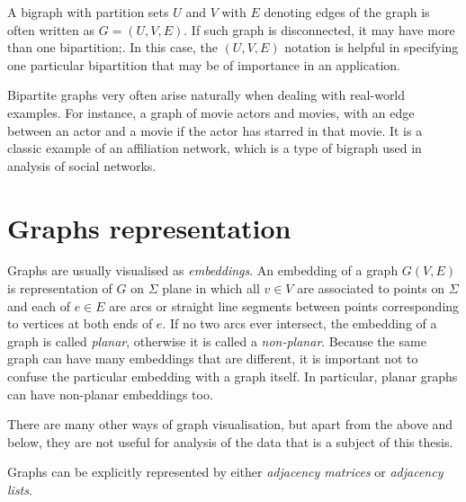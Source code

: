           A bigraph with partition sets $U$ and $V$ with $E$ denoting edges of the graph is often written as $G=(U,V,E)$. If such graph is disconnected, it may have more than one bipartition;\cite{ChartrandZhang2008}. In this case, the $(U,V,E)$ notation is helpful in specifying one particular bipartition that may be of importance in an application.
          
          Bipartite graphs very often arise naturally when dealing with real-world examples. For instance, a graph of movie actors and movies, with an edge between an actor and a movie if the actor has starred in that movie. It is a classic example of an affiliation network, which is a type of bigraph used in analysis of social networks\cite{WassermanFaust1994}.

  \section{Graphs representation}

    Graphs are usually visualised as \emph{embeddings}. An embedding of a graph $G(V, E)$ is representation of $G$ on $\Sigma$ plane in which all $v \in V$ are associated to points on $\Sigma$ and each of $e \in E$ are arcs or straight line segments between points corresponding to vertices at both ends of $e$. If no two arcs ever intersect, the embedding of a graph is called \emph{planar}, otherwise it is called a \emph{non-planar}. Because the same graph can have many embeddings that are different, it is important not to confuse the particular embedding with a graph itself. In particular, planar graphs can have non-planar embeddings too.

    There are many other ways of graph visualisation, but apart from the above and below, they are not useful for analysis of the data that is a subject of this thesis.

    Graphs can be explicitly represented by either \emph{adjacency matrices} or \emph{adjacency lists}.
        
